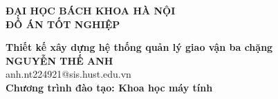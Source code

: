 \documentclass[DoAn.tex]{subfiles}
\begin{document}
\begin{titlepage}
\thispagestyle{empty}
\begin{center}

{\textbf{\large{ĐẠI HỌC BÁCH KHOA HÀ NỘI}}}\\[4cm]

{\textbf{\huge{ ĐỒ ÁN TỐT NGHIỆP}}}\\[1cm]
{\textbf{\Large{Thiết kế xây dựng hệ thống quản lý giao vận ba chặng}}\\[1cm]

{\textbf{\large{NGUYỄN THẾ ANH}}}\\
{\large{anh.nt224921@sis.hust.edu.vn}}\\[0.5cm]

{\textbf{\large{Chương trình đào tạo: Khoa học máy tính
}}}\\

\vspace{4cm}
\begin{table}[H]
\centering
{}
\end{table}}
\end{center}



\end{titlepage}
\end{document}
